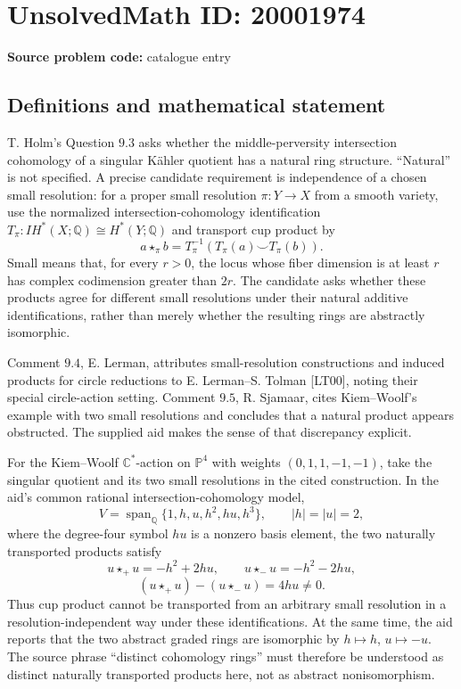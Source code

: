 \documentclass[11pt]{article}
\newcommand{\Q}{\mathbb{Q}}
\newcommand{\C}{\mathbb{C}}
\begin{document}
\section*{UnsolvedMath ID: 20001974}
\textbf{Source problem code:} catalogue entry
\subsection{Definitions and mathematical statement}
T. Holm's Question \(9.3\) asks whether the middle-perversity intersection cohomology of a singular K\"ahler quotient has a natural ring structure. ``Natural'' is not specified. A precise candidate requirement is independence of a chosen small resolution: for a proper small resolution \(\pi:Y\to X\) from a smooth variety, use the normalized intersection-cohomology identification \(T_\pi:IH^*(X;\Q)\cong H^*(Y;\Q)\) and transport cup product by
\[
 a\star_\pi b=T_\pi^{-1}(T_\pi(a)\smile T_\pi(b)).
\]
Small means that, for every \(r>0\), the locus whose fiber dimension is at least \(r\) has complex codimension greater than \(2r\). The candidate asks whether these products agree for different small resolutions under their natural additive identifications, rather than merely whether the resulting rings are abstractly isomorphic.

Comment \(9.4\), E. Lerman, attributes small-resolution constructions and induced products for circle reductions to E. Lerman--S. Tolman [LT00], noting their special circle-action setting. Comment \(9.5\), R. Sjamaar, cites Kiem--Woolf's example with two small resolutions and concludes that a natural product appears obstructed. The supplied aid makes the sense of that discrepancy explicit.

For the Kiem--Woolf \(\C^*\)-action on \(\mathbb P^4\) with weights \((0,1,1,-1,-1)\), take the singular quotient and its two small resolutions in the cited construction. In the aid's common rational intersection-cohomology model,
\[
 V=\operatorname{span}_\Q\{1,h,u,h^2,hu,h^3\},\qquad
 |h|=|u|=2,
\]
where the degree-four symbol \(hu\) is a nonzero basis element, the two naturally transported products satisfy
\[
 u\star_+u=-h^2+2hu,\qquad
 u\star_-u=-h^2-2hu,
\]
\[
 (u\star_+u)-(u\star_-u)=4hu\ne0.
\]
Thus cup product cannot be transported from an arbitrary small resolution in a resolution-independent way under these identifications. At the same time, the aid reports that the two abstract graded rings are isomorphic by \(h\mapsto h\), \(u\mapsto-u\). The source phrase ``distinct cohomology rings'' must therefore be understood as distinct naturally transported products here, not as abstract nonisomorphism.
\end{document}
